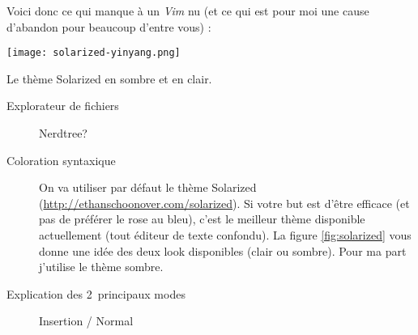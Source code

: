 Voici donc ce qui manque à un \emph{Vim} nu (et ce qui est pour moi une cause d'abandon pour beaucoup d'entre vous) :

\begin{marginfigure}%
  \texttt{[image: solarized-yinyang.png]}
  \caption{Le thème Solarized en sombre et en clair.}
  \label{fig:solarized}
\end{marginfigure}

\begin{description}
    \item[Explorateur de fichiers] Nerdtree?
    \item[Coloration syntaxique] On va utiliser par défaut le thème Solarized (\url{http://ethanschoonover.com/solarized}). Si votre but est d'être efficace (et pas de préférer le rose au bleu), c'est le meilleur thème disponible actuellement (tout éditeur de texte confondu). La figure \ref{fig:solarized} vous donne une idée des deux look disponibles (clair ou sombre). Pour ma part j'utilise le thème sombre.
    \item[Explication des 2 principaux modes] Insertion / Normal
\end{description}

\mainmatter



\printindex


